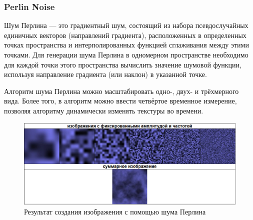 \documentclass[14pt, a4paper]{extarticle}
\begin{document}
\subsubsection{Perlin Noise}
Шум Перлина — это градиентный шум, состоящий из набора псевдослучайных единичных векторов (направлений градиента), расположенных в определенных точках пространства и интерполированных функцией сглаживания между этими точками. Для генерации шума Перлина в одномерном пространстве необходимо для каждой точки этого пространства вычислить значение шумовой функции, используя направление градиента (или наклон) в указанной точке.\par
Алгоритм шума Перлина можно масштабировать одно-, двух- и трёхмерного вида. Более того, в алгоритм можно ввести четвёртое временное измерение, позволяя алгоритму динамически изменять текстуры во времени.
\begin{figure}[h!]
	\centering
	\includegraphics[scale=0.9]{source/PerlinNoise}
	\caption{Результат создания изображения с помощью шума Перлина}
	\label{PerlinNoise}
\end{figure}
\newpage
\end{document}
